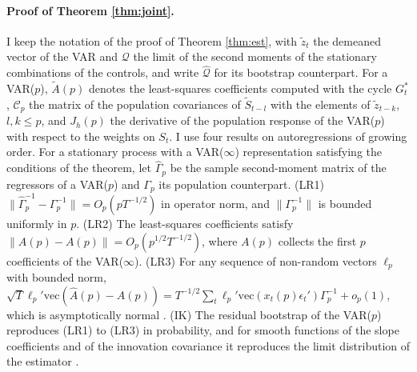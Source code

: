 \documentclass[12pt,a4paper]{article}
\theoremstyle{definition}
\theoremstyle{definition}\newtheorem{example}{Example}
\theoremstyle{definition}\newtheorem{definition}{Definition}
\begin{document}
\paragraph{Proof of Theorem \ref{thm:joint}.} I keep the notation of the proof of Theorem \ref{thm:est}, with $\tilde z_t$ the demeaned vector of the VAR and $\mathcal Q$ the limit of the second moments of the stationary combinations of the controls, and write $\hat{\mathcal Q}$ for its bootstrap counterpart. For a VAR($p$), $\tilde A(p)$ denotes the least-squares coefficients computed with the cycle $G^\ast_t$, $\mathcal C_p$ the matrix of the population covariances of $\tilde S_{t-l}$ with the elements of $\tilde z_{t-k}$, $l,k\leq p$, and $J_h(p)$ the derivative of the population response of the VAR($p$) with respect to the weights on $S_t$. I use four results on autoregressions of growing order. For a stationary process with a VAR($\infty$) representation satisfying the conditions of the theorem, let $\hat\Gamma_p$ be the sample second-moment matrix of the regressors of a VAR($p$) and $\Gamma_p$ its population counterpart. (LR1) $\|\hat\Gamma_p^{-1}-\Gamma_p^{-1}\|=O_p(pT^{-1/2})$ in operator norm, and $\|\Gamma_p^{-1}\|$ is bounded uniformly in $p$. (LR2) The least-squares coefficients satisfy $\|\hat A(p)-A(p)\|=O_p(p^{1/2}T^{-1/2})$, where $A(p)$ collects the first $p$ coefficients of the VAR($\infty$). (LR3) For any sequence of non-random vectors $\ell_p$ with bounded norm, $\sqrt{T}\ell_p'\mathrm{vec}(\hat A(p)-A(p))=T^{-1/2}\sum_t\ell_p'\mathrm{vec}(x_t(p)\epsilon_t')\Gamma_p^{-1}+o_p(1)$, which is asymptotically normal \citep{LewisReinsel1985}. (IK) The residual bootstrap of the VAR($p$) reproduces (LR1) to (LR3) in probability, and for smooth functions of the slope coefficients and of the innovation covariance it reproduces the limit distribution of the estimator \citep{InoueKilian2002}.
\end{document}
